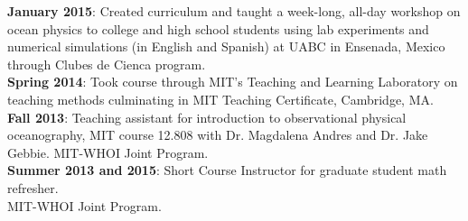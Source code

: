 \documentclass[paper=letter,fontsize=11pt]{scrartcl} %
\newcommand{\ShortEntry}[2]{\normalsize \noindent \textbf{#1}: #2 \\ }
\begin{document}
\ShortEntry{January 2015}{Created curriculum and taught a week-long, all-day workshop on ocean physics to college and high school students using lab experiments and numerical simulations (in English and Spanish) at UABC in Ensenada, Mexico through Clubes de Cienca program.}

\ShortEntry{Spring 2014}{Took course through MIT's Teaching and Learning Laboratory on teaching methods culminating in MIT Teaching Certificate, Cambridge, MA.}

\ShortEntry{Fall 2013}{Teaching assistant for introduction to observational physical oceanography, MIT course 12.808 with Dr. Magdalena Andres and Dr. Jake Gebbie. MIT-WHOI Joint Program.}

\ShortEntry{Summer 2013 and 2015}{Short Course Instructor for graduate student math refresher.\\ MIT-WHOI Joint Program.}
\end{document}
